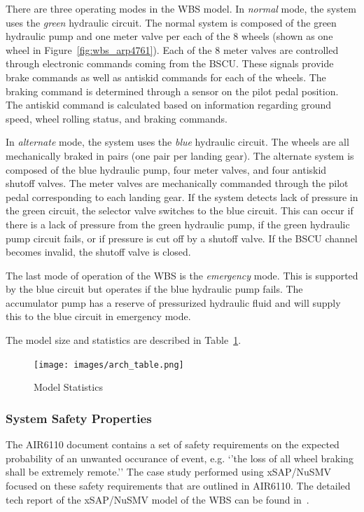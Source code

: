 There are three operating modes in the WBS model. In \textit{normal} mode, the system uses the \textit{green} hydraulic circuit. The normal system is composed of the green hydraulic pump and one meter valve per each of the 8 wheels (shown as one wheel in Figure~\ref{fig:wbs_arp4761}). Each of the 8 meter valves are controlled through electronic commands coming from the BSCU. These signals provide brake commands as well as antiskid commands for each of the wheels. The braking command is determined through a sensor on the pilot pedal position. The antiskid command is calculated based on information regarding ground speed, wheel rolling status, and braking commands.

In \textit{alternate} mode, the system uses the \textit{blue} hydraulic circuit.  The wheels are all mechanically braked in pairs (one pair per landing gear). The alternate system is composed of the blue hydraulic pump, four meter valves, and four antiskid shutoff valves. The meter valves are mechanically commanded through the pilot pedal corresponding to each landing gear. If the system detects lack of pressure in the green circuit, the selector valve switches to the blue circuit. This can occur if there is a lack of pressure from the green hydraulic pump, if the green hydraulic pump circuit fails, or if pressure is cut off by a shutoff valve. If the BSCU channel becomes invalid, the shutoff valve is closed.

The last mode of operation of the WBS is the \textit{emergency} mode. This is supported by the blue circuit but operates if the blue hydraulic pump fails. The accumulator pump has a reserve of pressurized hydraulic fluid and will supply this to the blue circuit in emergency mode.

The model size and statistics are described in Table~\ref{fig:arch_table}. 

\begin{figure}[h]
\begin{center}
\texttt{[image: images/arch\_table.png]}
\caption{Model Statistics} \label{fig:arch_table}
\end{center}
\end{figure}

\subsubsection{System Safety Properties}
The AIR6110 document contains a set of safety requirements on the expected probability of an unwanted occurance of event, e.g. `'the loss of all wheel braking shall be extremely remote.'' The case study performed using xSAP/NuSMV~\cite{mattareiThesis, DBLP:conf/cav/BozzanoCPJKPRT15} focused on these safety requirements that are outlined in AIR6110. The detailed tech report of the xSAP/NuSMV model of the WBS can be found in~\cite{air6110TechReport}.

